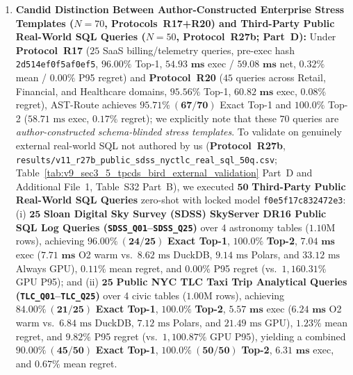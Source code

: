 \documentclass[10pt,a4paper]{article}
\begin{document}
\begin{enumerate}[leftmargin=1.5em,itemsep=1pt]
    \item \textbf{Candid Distinction Between Author-Constructed Enterprise Stress Templates ($N=70$, Protocols~R17+R20) and Third-Party Public Real-World SQL Queries ($N=50$, Protocol~R27b; Part~D):} Under \textbf{Protocol~R17} ($25$ SaaS billing/telemetry queries, pre-exec hash \texttt{2d514ef0f5af0ef5}, $\mathbf{96.00\%}$ Top-1, $\mathbf{54.93\text{ ms}}$ exec / $\mathbf{59.08\text{ ms}}$ net, $0.32\%$ mean / $0.00\%$ P95 regret) and \textbf{Protocol~R20} ($45$ queries across Retail, Financial, and Healthcare domains, $\mathbf{95.56\%}$ Top-1, $\mathbf{60.82\text{ ms}}$ exec, $0.08\%$ regret), AST-Route achieves $\mathbf{95.71\%\ (67/70)}$ Exact Top-1 and $\mathbf{100.0\%}$ Top-2 ($58.71\text{ ms}$ exec, $0.17\%$ regret); we explicitly note that these $70$ queries are \emph{author-constructed schema-blinded stress templates}. To validate on genuinely external real-world SQL not authored by us (\textbf{Protocol~R27b}, \texttt{results/v11\_r27b\_public\_sdss\_nyctlc\_real\_sql\_50q.csv}; Table~\ref{tab:v9_sec3_5_tpcds_bird_external_validation} Part~D and Additional File~1, Table~S32 Part~B), we executed $\mathbf{50}$ \textbf{Third-Party Public Real-World SQL Queries} zero-shot with locked model \texttt{f0e5f17c832472e3}: (i) $\mathbf{25}$ \textbf{Sloan Digital Sky Survey (SDSS) SkyServer DR16 Public SQL Log Queries (\texttt{SDSS\_Q01}--\texttt{SDSS\_Q25})} over 4 astronomy tables ($1.10\text{M}$ rows), achieving $\mathbf{96.00\%\ (24/25)}$ \textbf{Exact Top-1}, $\mathbf{100.0\%}$ \textbf{Top-2}, $\mathbf{7.04\text{ ms}}$ exec ($\mathbf{7.71\text{ ms}}$ O2 warm vs.\ $8.62\text{ ms}$ DuckDB, $9.14\text{ ms}$ Polars, and $33.12\text{ ms}$ Always GPU), $\mathbf{0.11\%}$ mean regret, and $\mathbf{0.00\%}$ P95 regret (vs.\ $1{,}160.31\%$ GPU P95); and (ii) $\mathbf{25}$ \textbf{Public NYC TLC Taxi Trip Analytical Queries (\texttt{TLC\_Q01}--\texttt{TLC\_Q25})} over 4 civic tables ($1.00\text{M}$ rows), achieving $\mathbf{84.00\%\ (21/25)}$ \textbf{Exact Top-1}, $\mathbf{100.0\%}$ \textbf{Top-2}, $\mathbf{5.57\text{ ms}}$ exec ($\mathbf{6.24\text{ ms}}$ O2 warm vs.\ $6.84\text{ ms}$ DuckDB, $7.12\text{ ms}$ Polars, and $21.49\text{ ms}$ GPU), $\mathbf{1.23\%}$ mean regret, and $\mathbf{9.82\%}$ P95 regret (vs.\ $1{,}100.87\%$ GPU P95), yielding a combined $\mathbf{90.00\%\ (45/50)}$ \textbf{Exact Top-1}, $\mathbf{100.0\%\ (50/50)}$ \textbf{Top-2}, $\mathbf{6.31\text{ ms}}$ exec, and $\mathbf{0.67\%}$ mean regret.
\end{enumerate}
\end{document}
